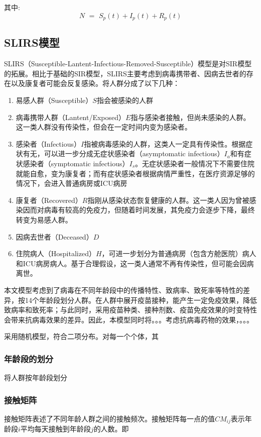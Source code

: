 \documentclass[bwprint]{gmcmthesis}
\numberwithin{figure}{section}
\begin{document}
其中:
\begin{equation} \label{}
    N\,\,=\,\,S_p\left( t \right) +I_p\left( t \right) +R_p\left( t \right) 
\end{equation}

\subsection{SLIRS模型}
SLIRS（Susceptible-Lantent-Infectious-Removed-Susceptible）模型是对SIR模型的拓展。相比于基础的SIR模型，SLIRS主要考虑到病毒携带者、因病去世者的存在以及康复者可能会反复感染。将人群分成了以下几种：
\begin{enumerate}
\item 易感人群（Susceptible）$S$指会被感染的人群
\item 病毒携带人群（Lantent/Exposed）$E$指与感染者接触，但尚未感染的人群。这一类人群没有传染性，但会在一定时间内变为感染者。
\item 感染者（Infectious）$I$指被病毒感染的人群，这类人一定具有传染性。根据症状有无，可以进一步分成无症状感染者（asymptomatic infectious）$I_a$和有症状感染者（symptomatic infectious）$I_s$。无症状感染者一般情况下不需要住院就能自愈，变为康复者；而有症状感染者根据病情严重性，在医疗资源足够的情况下，会进入普通病房或ICU病房
\item 康复者（Recovered）$R$指刚从感染状态恢复健康的人群。这一类人因为曾被感染因而对病毒有较高的免疫力，但随着时间发展，其免疫力会逐步下降，最终转变为易感人群。
\item 因病去世者（Deceased）$D$
\item 住院病人（Hospitalized）$H$，可进一步划分为普通病房（包含方舱医院）病人和ICU病房病人。基于合理假设，这一类人通常不再有传染性，但可能会因病离世。

\end{enumerate}
\par 本文模型考虑到了病毒在不同年龄段中的传播特性、致病率、致死率等特性的差异，按14个年龄段划分人群。在人群中展开疫苗接种，能产生一定免疫效果，降低致病率和致死率；与此同时，采用疫苗种类、接种剂数、疫苗免疫效果的时变特性会带来抗病毒效果的差异。因此，本模型同时将。。。考虑抗病毒药物的效果，。。。
\par 采用随机模型，符合二项分布。对每一个个体，其
\subsubsection{年龄段的划分}
将人群按年龄段划分
\subsubsection{接触矩阵}
接触矩阵表述了不同年龄人群之间的接触频次。接触矩阵每一点的值$CM_{ij}$表示年龄段$i$平均每天接触到年龄段$j$的人数。即
\end{document}
